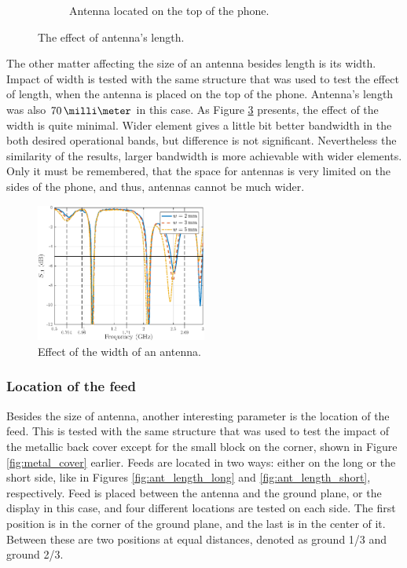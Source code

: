 \begin{figure}[H]
\begin{subfigure}[b]{0.49\textwidth}
        \caption{Antenna located on the top of the phone.}
        \label{fig:ant_length_short_res}
    \end{subfigure}
    \caption{The effect of antenna's length.}
    \label{fig:ant_length_result}
\end{figure}

The other matter affecting the size of an antenna besides length is its width. Impact of width is tested with the same structure that was used to test the effect of length, when the antenna is placed on the top of the phone. Antenna's length was also $70\,\milli\meter$ in this case. As Figure \ref{fig:width_res} presents, the effect of the width is quite minimal. Wider element gives a little bit better bandwidth in the both desired operational bands, but difference is not significant. Nevertheless the similarity of the results, larger bandwidth is more achievable with wider elements. Only it must be remembered, that the space for antennas is very limited on the sides of the phone, and thus, antennas cannot be much wider.

\begin{figure}[H]
    \centering
    \includegraphics[width=0.5\textwidth]{img/width_res.eps}
    \caption{Effect of the width of an antenna.}
    \label{fig:width_res}
\end{figure}


\subsubsection{Location of the feed}
\label{sec:feed}
Besides the size of antenna, another interesting parameter is the location of the feed. This is tested with the same structure that was used to test the impact of the metallic back cover except for the small block on the corner, shown in Figure \ref{fig:metal_cover} earlier. Feeds are located in two ways: either on the long or the short side, like in Figures \ref{fig:ant_length_long} and \ref{fig:ant_length_short}, respectively. Feed is placed between the antenna and the ground plane, or the display in this case, and four different locations are tested on each side. The first position is in the corner of the ground plane, and the last is in the center of it. Between these are two positions at equal distances, denoted as ground 1/3 and ground 2/3.

